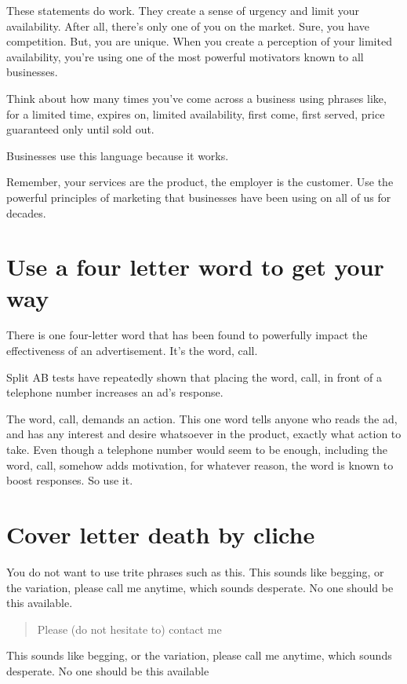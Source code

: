 \documentclass[12pt]{article}
\begin{document}
These statements do work. They create a sense of urgency and limit your
availability. After all, there's only one of you on the market. Sure,
you have competition. But, you are unique. When you create a perception
of your limited availability, you're using one of the most powerful
motivators known to all businesses.

Think about how many times you've come across a business using phrases
like, for a limited time, expires on, limited availability, first come,
first served, price guaranteed only until sold out.

Businesses use this language because it works.

Remember, your services are the product, the employer is the customer.
Use the powerful principles of marketing that businesses have been using
on all of us for decades.

\section{Use a four letter word to get your way}

There is one four-letter word that has been found to powerfully impact
the effectiveness of an advertisement. It's the word, call.

Split AB tests have repeatedly shown that placing the word, call, in
front of a telephone number increases an ad's response.

The word, call, demands an action. This one word tells anyone who reads
the ad, and has any interest and desire whatsoever in the product,
exactly what action to take. Even though a telephone number would seem
to be enough, including the word, call, somehow adds motivation, for
whatever reason, the word is known to boost responses. So use it.

\section{Cover letter death by cliche}

You do not want to use trite phrases such as this. This sounds like
begging, or the variation, please call me anytime, which sounds
desperate. No one should be this available.

\begin{quote}
Please (do not hesitate to) contact me
\end{quote}

This sounds like begging, or the variation, please call me anytime,
which sounds desperate. No one should be this available
\end{document}
